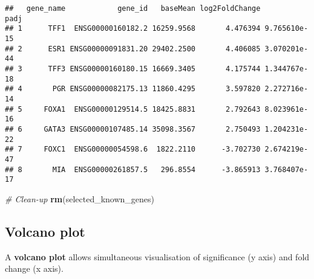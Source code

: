 \documentclass[]{book}
\newenvironment{Shaded}{\begin{snugshade}}{\end{snugshade}}
\newcommand{\KeywordTok}[1]{\textcolor[rgb]{0.13,0.29,0.53}{\textbf{#1}}}
\newcommand{\FloatTok}[1]{\textcolor[rgb]{0.00,0.00,0.81}{#1}}
\newcommand{\StringTok}[1]{\textcolor[rgb]{0.31,0.60,0.02}{#1}}
\newcommand{\CommentTok}[1]{\textcolor[rgb]{0.56,0.35,0.01}{\textit{#1}}}
\newcommand{\OperatorTok}[1]{\textcolor[rgb]{0.81,0.36,0.00}{\textbf{#1}}}
\newcommand{\NormalTok}[1]{#1}
\begin{document}
\begin{Shaded}
\end{Shaded}

\begin{verbatim}
##   gene_name            gene_id   baseMean log2FoldChange         padj
## 1      TFF1  ENSG00000160182.2 16259.9568       4.476394 9.765610e-15
## 2      ESR1 ENSG00000091831.20 29402.2500       4.406085 3.070201e-44
## 3      TFF3 ENSG00000160180.15 16669.3405       4.175744 1.344767e-18
## 4       PGR ENSG00000082175.13 11860.4295       3.597820 2.272716e-14
## 5     FOXA1  ENSG00000129514.5 18425.8831       2.792643 8.023961e-16
## 6     GATA3 ENSG00000107485.14 35098.3567       2.750493 1.204231e-22
## 7     FOXC1  ENSG00000054598.6  1822.2110      -3.702730 2.674219e-47
## 8       MIA  ENSG00000261857.5   296.8554      -3.865913 3.768407e-17
\end{verbatim}

\begin{Shaded}
\begin{Highlighting}[]
\CommentTok{# Clean-up}
\KeywordTok{rm}\NormalTok{(selected_known_genes)}
\end{Highlighting}
\end{Shaded}

\subsection{Volcano plot}\label{volcano-plot}

A \textbf{volcano plot} allows simultaneous visualisation of
significance (y axis) and fold change (x axis).
\end{document}
